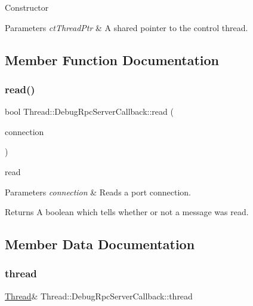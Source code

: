 Constructor 
\begin{DoxyParams}{Parameters}
{\em ct\+Thread\+Ptr} & A shared pointer to the control thread. \\
\hline
\end{DoxyParams}


\subsection{Member Function Documentation}
\hypertarget{classThread_1_1DebugRpcServerCallback_a3b39ac9b379ce3212bb2b05a89fa6024}{}\label{classThread_1_1DebugRpcServerCallback_a3b39ac9b379ce3212bb2b05a89fa6024} 
\subsubsection{\texorpdfstring{read()}{read()}}
{\footnotesize\ttfamily bool Thread\+::\+Debug\+Rpc\+Server\+Callback\+::read (\begin{DoxyParamCaption}\item[{yarp\+::os\+::\+Connection\+Reader \&}]{connection }\end{DoxyParamCaption})\hspace{0.3cm}{\ttfamily [virtual]}}

read 
\begin{DoxyParams}{Parameters}
{\em connection} & Reads a port connection.\\
\hline
\end{DoxyParams}
\begin{DoxyReturn}{Returns}
A boolean which tells whether or not a message was read. 
\end{DoxyReturn}


\subsection{Member Data Documentation}
\hypertarget{classThread_1_1DebugRpcServerCallback_ad75683fc200019e8f681ad441b6ce84b}{}\label{classThread_1_1DebugRpcServerCallback_ad75683fc200019e8f681ad441b6ce84b} 
\subsubsection{\texorpdfstring{thread}{thread}}
{\footnotesize\ttfamily \hyperlink{classThread}{Thread}\& Thread\+::\+Debug\+Rpc\+Server\+Callback\+::thread\hspace{0.3cm}{\ttfamily [private]}}

